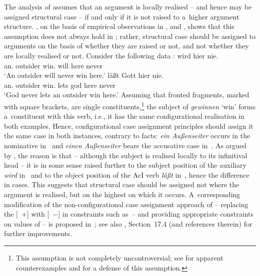 \documentclass[output=paper
                ,modfonts
                ,nonflat
	        ,collection
	        ,collectionchapter
	        ,collectiontoclongg
 	        ,biblatex
                ,babelshorthands
                ,newtxmath
                ,draftmode
                ,colorlinks, citecolor=brown
]{./langsci/langscibook}
\begin{document}
The analysis of \citet{prze:96,Prze99b,Prze99} assumes that an argument is locally realised – and hence may be assigned structural case – if and only if it is not raised to a~higher argument structure.  \citet{Meurers99c,Meurers99b}, on the basis of empirical observations in \citet{Haider90a}, \citet{Grewendorf94a} and \citet{Mueller97c-Eng}, shows that this assumption does not always hold in ; rather, structural case should be assigned to arguments on the basis of whether they are raised or not, and not whether they are locally realised or not.  Consider the following data \citep[294]{Meurers99c}:
\eal
\ex\label{win:ss}
 wird hier nie. \\
    \phtm{[}an.\NOM{} outsider win.\INF{} will here never\\
\glt `An outsider will never win here.'
\ex\label{win:so}
 läßt Gott hier nie. \\
    \phtm{[}an.\ACC{} outsider win.\INF{} lets god here never\\
\glt `God never lets an outsider win here.'
\zl
Assuming that fronted fragments, marked with square brackets, are single constituents,\footnote{This assumption is not completely uncontroversial; see \citet[100–101]{Kiss94} for apparent counterexamples and \citet{Mueller2003b,Mueller2005d,MuellerGS} for a defense of this assumption.} the subject of \emph{gewinnen} `win’ forms a~constituent with this verb, i.e., it has the same configurational realisation in both examples.  Hence, configurational case assignment principles should assign it the same case in both instances, contrary to facts: \emph{ein Au\ss{}enseiter} occurs in the nominative in~ and \emph{einen Au\ss{}enseiter} bears the accusative case in~.  As argued by \citet{Meurers99c,Meurers99b}, the reason is that – although the subject is realised locally to its infinitival head – it is in some sense raised further to the subject position of the auxiliary \emph{wird} in~ and to the object position of the AcI verb \emph{l\"a\ss{}t} in~, hence the difference in cases.  This suggests that structural case should be assigned not where the argument is realised, but on the highest  on which it occurs.  A~corresponding modification of the non-configurational case assignment approach of \citet{prze:96,Prze99b,Prze99} – replacing the [~$+$] with [~$-$] in constraints such as~– and providing appropriate constraints on values of  – is proposed in~\citet[93–95]{Prze99b}; see also \citet{MuellerLehrbuch3}, Section~17.4 (and references therein) for further improvements.
\end{document}
